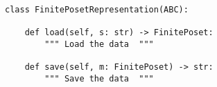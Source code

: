 \begin{verbatim}
class FinitePosetRepresentation(ABC):

    def load(self, s: str) -> FinitePoset:
        """ Load the data  """

    def save(self, m: FinitePoset) -> str:
        """ Save the data  """
\end{verbatim}